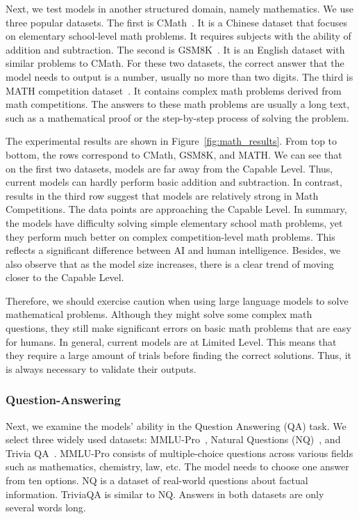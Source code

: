 

Next, we test models in another structured domain, namely mathematics. We use three popular datasets. The first is CMath~\citep{wei2023cmath}. It is a Chinese dataset that focuses on elementary school-level math problems. It requires subjects with the ability of addition and subtraction. The second is GSM8K~\citep{cobbe2021gsm8k}. It is an English dataset with similar problems to CMath. For these two datasets, the correct answer that the model needs to output is a number, usually no more than two digits. The third is MATH competition dataset~\citep{hendrycksmath2021}. It contains complex math problems derived from math competitions. The answers to these math problems are usually a long text, such as a mathematical proof or the step-by-step process of solving the problem. 

The experimental results are shown in Figure~\ref{fig:math_results}. From top to bottom, the rows correspond to CMath, GSM8K, and MATH. We can see that on the first two datasets, models are far away from the Capable Level. Thus, current models can hardly perform basic addition and subtraction. In contrast, results in the third row suggest that models are relatively strong in Math Competitions. The data points are approaching the Capable Level. In summary, the models have difficulty solving simple elementary school math problems, yet they perform much better on complex competition-level math problems. This reflects a significant difference between AI and human intelligence. Besides, we also observe that as the model size increases, there is a clear trend of moving closer to the Capable Level.

Therefore, we should exercise caution when using large language models to solve mathematical problems. Although they might solve some complex math questions, they still make significant errors on basic math problems that are easy for humans. In general, current models are at Limited Level. This means that they require a large amount of trials before finding the correct solutions. Thus, it is always necessary to validate their outputs.

\subsubsection{Question-Answering}



Next, we examine the models' ability in the Question Answering (QA) task. We select three widely used datasets: MMLU-Pro~\citep{wang2024mmlu}, Natural Questions (NQ)~\citep{lee2019latent, Kwiatkowski2019NaturalQ}, and Trivia QA~\citep{2017arXivtriviaqa}. MMLU-Pro consists of multiple-choice questions across various fields such as mathematics, chemistry, law, etc. The model needs to choose one answer from ten options. NQ is a dataset of real-world questions about factual information. TriviaQA is similar to NQ. Answers in both datasets are only several words long. 

